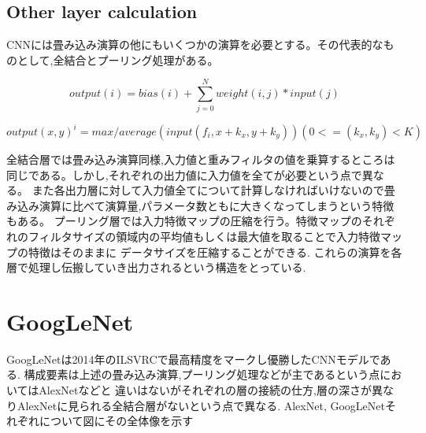 {\subsection{Other layer calculation}
\label{sec:other_calc}
CNNには畳み込み演算の他にもいくつかの演算を必要とする。その代表的なものとして,全結合とプーリング処理がある。

\begin{equation}
  \label{eq:fc}
  output(i) = bias(i) + \sum_{j=0}^{N} weight(i, j) * input(j)
\end{equation}

\begin{equation}
  \label{eq:pool}
	output(x, y)^{i} = max / average(input(f_i,x + k_x, y + k_y)) (0<= (k_x, k_y) < K)
\end{equation}

全結合層では畳み込み演算同様,入力値と重みフィルタの値を乗算するところは同じである。しかし,それぞれの出力値に入力値を全てが必要という点で異なる。
また各出力層に対して入力値全てについて計算しなければいけないので畳み込み演算に比べて演算量,パラメータ数ともに大きくなってしまうという特徴もある。
プーリング層では入力特徴マップの圧縮を行う。特徴マップのそれぞれのフィルタサイズの領域内の平均値もしくは最大値を取ることで入力特徴マップの特徴はそのままに
データサイズを圧縮することができる.
これらの演算を各層で処理し伝搬していき出力されるという構造をとっている.

\section{GoogLeNet}
\label{sec:googlenet}
GoogLeNetは2014年のILSVRCで最高精度をマークし優勝したCNNモデルである.
構成要素は上述の畳み込み演算,プーリング処理などが主であるという点においてはAlexNetなどと
違いはないがそれぞれの層の接続の仕方,層の深さが異なりAlexNetに見られる全結合層がないという点で異なる.
AlexNet, GoogLeNetそれぞれについて図にその全体像を示す


}
